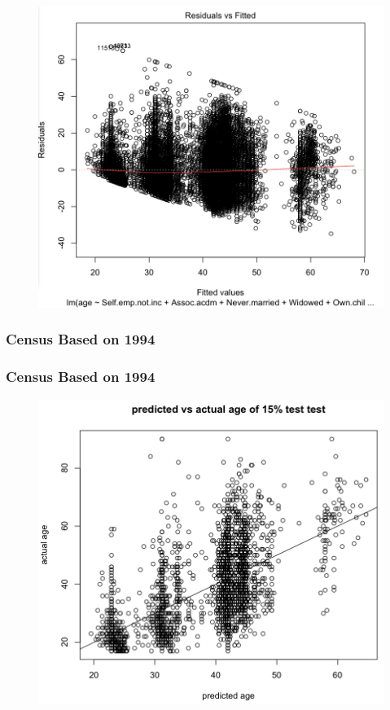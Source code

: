 \documentclass{beamer}
\begin{document}
\begin{frame}
\frametitle{}

\begin{figure}
 \includegraphics[scale=0.3]{figures/ageResidCensus.png}
 \label{fig:ageResidCensus}
\end{figure}
 
\end{frame}

\begin{frame}
\frametitle{Census Based on 1994}
\end{frame}

\begin{frame}
\frametitle{Census Based on 1994}
\end{frame}

\begin{frame}
\begin{figure}
\includegraphics[scale=0.3]{figures/predVsActualCensus.png}
\label{fig:predVsActualCensus}
\end{figure}
\end{frame}
\end{document}
